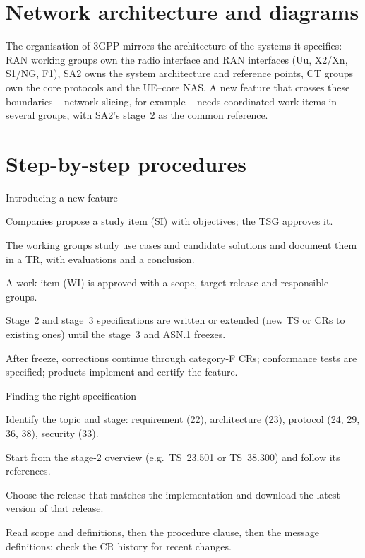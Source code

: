 \documentclass[11pt,a4paper]{article}
\begin{document}
\section{Network architecture and diagrams}
The organisation of 3GPP mirrors the architecture of the systems it specifies: RAN working groups own the radio
interface and RAN interfaces (Uu, X2/Xn, S1/NG, F1), SA2 owns the system architecture and reference points, CT
groups own the core protocols and the UE--core NAS. A new feature that crosses these boundaries -- network slicing,
for example -- needs coordinated work items in several groups, with SA2's stage~2 as the common reference.

\section{Step-by-step procedures}

\begin{procedurebox}{Introducing a new feature}\label{proc:feature}
\begin{steps}
  \item Companies propose a study item (SI) with objectives; the TSG approves it.
  \item The working groups study use cases and candidate solutions and document them in a TR, with evaluations and a
        conclusion.
  \item A work item (WI) is approved with a scope, target release and responsible groups.
  \item Stage~2 and stage~3 specifications are written or extended (new TS or CRs to existing ones) until the
        stage~3 and ASN.1 freezes.
  \item After freeze, corrections continue through category-F CRs; conformance tests are specified; products
        implement and certify the feature.
\end{steps}
\end{procedurebox}

\begin{procedurebox}{Finding the right specification}\label{proc:find}
\begin{steps}
  \item Identify the topic and stage: requirement (22), architecture (23), protocol (24, 29, 36, 38), security (33).
  \item Start from the stage-2 overview (e.g.\ TS~23.501 or TS~38.300) and follow its references.
  \item Choose the release that matches the implementation and download the latest version of that release.
  \item Read scope and definitions, then the procedure clause, then the message definitions; check the CR history for
        recent changes.
\end{steps}
\end{procedurebox}
\end{document}

